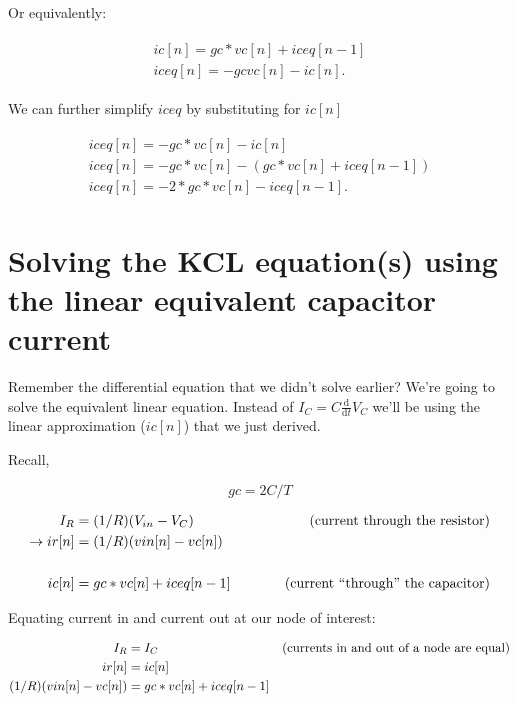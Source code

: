 \documentclass{article}
\begin{document}
Or equivalently:

\begin{eqnarray} \begin{array}{l}
ic[n] = gc * vc[n] + iceq[n-1]\\
iceq[n] = - gc vc[n] - ic[n].
\end{array} \end{eqnarray}

We can further simplify $iceq$ by substituting for $ic[n]$

\begin{eqnarray} \begin{array}{l}
iceq[n] = - gc*vc[n] - ic[n]\\
iceq[n] = - gc*vc[n] - (gc * vc[n] + iceq[n-1])\\
iceq[n] = -2*gc*vc[n] - iceq[n-1].
\end{array} \end{eqnarray}


\section{Solving the KCL equation(s) using the linear equivalent capacitor current}

Remember the differential equation that we didn't solve earlier? We're
going to solve the equivalent linear equation. Instead of 
$I_C = C\frac{\mathrm{d}}{\mathrm{d}t}V_C$
we'll be using the linear approximation ($ic[n]$) that we just derived.

Recall,

\begin{equation}
gc = 2C/T
\end{equation}

\begin{equation}
\begin{aligned}
		   I_R &= (1/R) (V_{in} - V_C)	 	&\text{(current through the resistor)} \\
\to	     ir[n] &= (1/R) (vin[n] - vc[n])    \hspace{.1\textwidth}& \\
\\
	     ic[n] &= gc * vc[n] + iceq[n-1]    &\text{(current ``through'' the capacitor)}
\end{aligned}
\end{equation}

Equating current in and current out at our node of interest:

\begin{equation}
\begin{aligned}
                   I_R &= I_C	 	&\text{(currents in and out of a node are equal)} \\
                 ir[n] &= ic[n]	\hspace{.1\textwidth}& \\
(1/R) (vin[n] - vc[n]) &= gc * vc[n] + iceq[n-1]
\end{aligned}
\end{equation}
\end{document}
